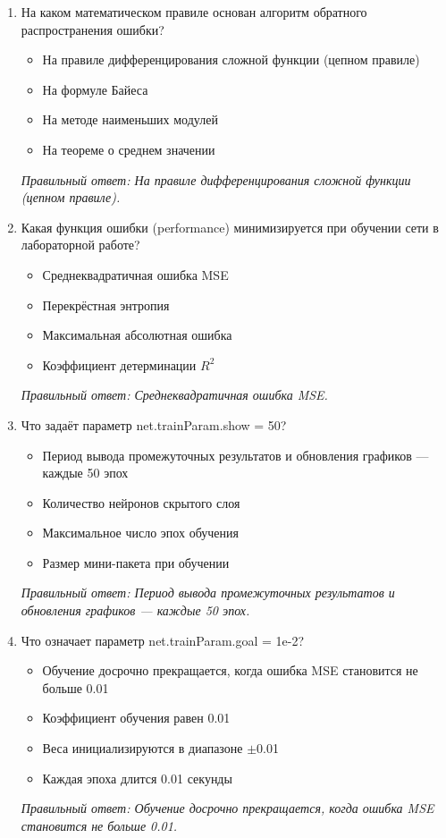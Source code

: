 \begin{enumerate}[label=\textbf{\arabic*.}, leftmargin=0pt, itemsep=1.2em]
\item На каком математическом правиле основан алгоритм обратного распространения ошибки?
\begin{itemize}[label=$\square$, leftmargin=1.5cm, itemsep=0.2em, topsep=0.3em]
\item На правиле дифференцирования сложной функции (цепном правиле)
\item На формуле Байеса
\item На методе наименьших модулей
\item На теореме о среднем значении
\end{itemize}
{\small\textit{Правильный ответ: На правиле дифференцирования сложной функции (цепном правиле).}}

\item Какая функция ошибки (performance) минимизируется при обучении сети в лабораторной работе?
\begin{itemize}[label=$\square$, leftmargin=1.5cm, itemsep=0.2em, topsep=0.3em]
\item Среднеквадратичная ошибка MSE
\item Перекрёстная энтропия
\item Максимальная абсолютная ошибка
\item Коэффициент детерминации $R^2$
\end{itemize}
{\small\textit{Правильный ответ: Среднеквадратичная ошибка MSE.}}

\item Что задаёт параметр net.trainParam.show = 50?
\begin{itemize}[label=$\square$, leftmargin=1.5cm, itemsep=0.2em, topsep=0.3em]
\item Период вывода промежуточных результатов и обновления графиков — каждые 50 эпох
\item Количество нейронов скрытого слоя
\item Максимальное число эпох обучения
\item Размер мини-пакета при обучении
\end{itemize}
{\small\textit{Правильный ответ: Период вывода промежуточных результатов и обновления графиков — каждые 50 эпох.}}

\item Что означает параметр net.trainParam.goal = 1e-2?
\begin{itemize}[label=$\square$, leftmargin=1.5cm, itemsep=0.2em, topsep=0.3em]
\item Обучение досрочно прекращается, когда ошибка MSE становится не больше 0.01
\item Коэффициент обучения равен 0.01
\item Веса инициализируются в диапазоне $\pm$0.01
\item Каждая эпоха длится 0.01 секунды
\end{itemize}
{\small\textit{Правильный ответ: Обучение досрочно прекращается, когда ошибка MSE становится не больше 0.01.}}


\end{enumerate}
